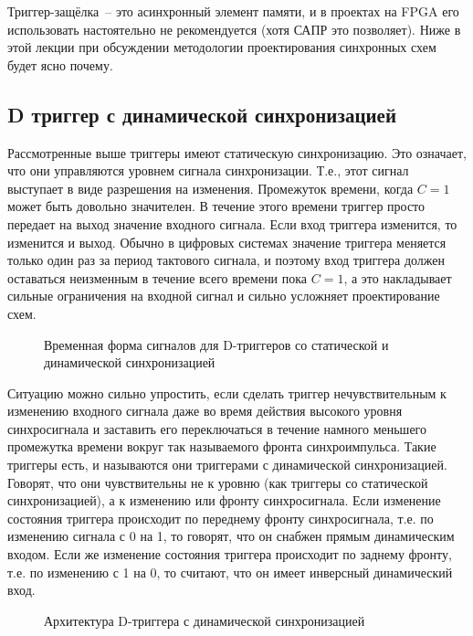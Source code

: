 Триггер-защёлка~-- это асинхронный элемент памяти, и в проектах на FPGA его использовать настоятельно не рекомендуется (хотя САПР это позволяет). Ниже в этой лекции при обсуждении методологии проектирования синхронных схем будет ясно почему.

\subsection{D триггер с динамической синхронизацией}

Рассмотренные выше триггеры имеют статическую синхронизацию. Это означает, что они управляются уровнем сигнала синхронизации. Т.е., этот сигнал выступает в виде разрешения на изменения. Промежуток времени, когда $C=1$ может быть довольно значителен. В течение этого времени триггер просто передает на выход значение входного сигнала. Если вход триггера изменится, то изменится и выход. Обычно в цифровых системах значение триггера меняется только один раз за период тактового сигнала, и поэтому вход триггера должен оставаться неизменным в течение всего времени пока $C=1$, а это накладывает сильные ограничения на входной сигнал и сильно усложняет проектирование схем.

\begin{figure}[ht]
\centering
{}
\caption{Временная форма сигналов для D-триггеров со статической и динамической синхронизацией}
\label{D_trigger_waveform}
\end{figure}

Ситуацию можно сильно упростить, если сделать триггер нечувствительным к изменению входного сигнала даже во время действия высокого уровня синхросигнала и заставить его переключаться в течение намного меньшего промежутка времени вокруг так называемого фронта синхроимпульса. Такие триггеры есть, и называются они триггерами с динамической синхронизацией. Говорят, что они чувствительны не к уровню (как триггеры со статической синхронизацией), а к изменению или фронту синхросигнала. Если изменение состояния триггера происходит по переднему фронту синхросигнала, т.е. по изменению сигнала с 0 на 1, то говорят, что он снабжен прямым динамическим входом. Если же изменение состояния триггера происходит по заднему фронту, т.е. по изменению с 1 на 0, то считают, что он имеет инверсный динамический вход.

\begin{figure}[ht]
\centering
{}
\caption{Архитектура D-триггера с динамической синхронизацией}
\label{D_trigger_arch}
\end{figure}

